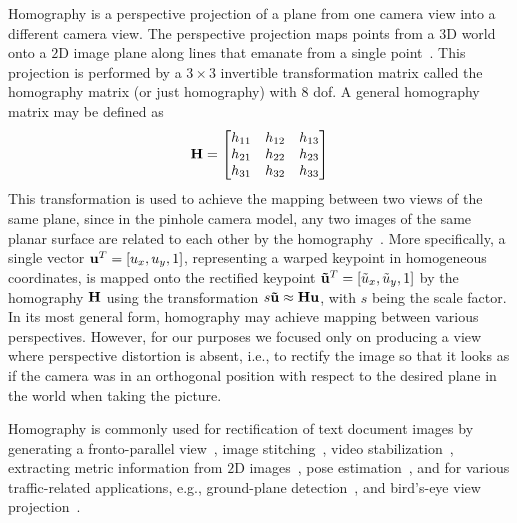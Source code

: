 Homography is a perspective projection of a plane from one camera view into a different camera view. The perspective projection maps points from a $3$D world onto a $2$D image plane along lines that emanate from a single point~\cite{geetha2013automatic, bousaid2020perspective}. This projection is performed by a $3 \times 3$ invertible transformation matrix called the homography matrix (or just homography) with $8$ \gls{dof}. A general homography matrix may be defined as
\begin{equation}
    \label{eq:HomographyMatrix}
    \mathbf{H} =
    \begin{bmatrix}
        h_{11} & h_{12} & h_{13}\\
        h_{21} & h_{22} & h_{23}\\
        h_{31} & h_{32} & h_{33}
    \end{bmatrix}
\end{equation}
This transformation is used to achieve the mapping between two views of the same plane, since in the pinhole camera model, any two images of the same planar surface are related to each other by the homography~\cite{hartley2003multiple, hartley1997defense}. More specifically, a single vector ${\mathbf{u}}^T = \left[ {u_x, u_y, 1} \right]$, representing a warped keypoint in homogeneous coordinates, is mapped onto the rectified keypoint  ${\mathbf{\tilde{u}}}^T = \left[ {\tilde{u}_x, \tilde{u}_y, 1} \right]$ by the homography $\mathbf{H}$ using the transformation $s \mathbf{\tilde{u}} \approx \mathbf{H} \mathbf{u}$, with $s$ being the scale factor. In its most general form, homography may achieve mapping between various perspectives. However, for our purposes we focused only on producing a view where perspective distortion is absent, i.e., to rectify the image so that it looks as if the camera was in an orthogonal position with respect to the desired plane in the world when taking the picture.

Homography is commonly used for rectification of text document images by generating a fronto-parallel view~\cite{lu2005perspective, miao2006perspective}, image stitching~\cite{adel2014image, gao2011constructing}, video stabilization~\cite{liu2015smooth}, extracting metric information from $2$D images~\cite{zhang2000flexible}, pose estimation~\cite{circularmarkerposeestim}, and for various traffic-related applications, e.g., ground-plane detection~\cite{arrospide2010homography}, and bird's-eye view projection~\cite{luo2010low}.

